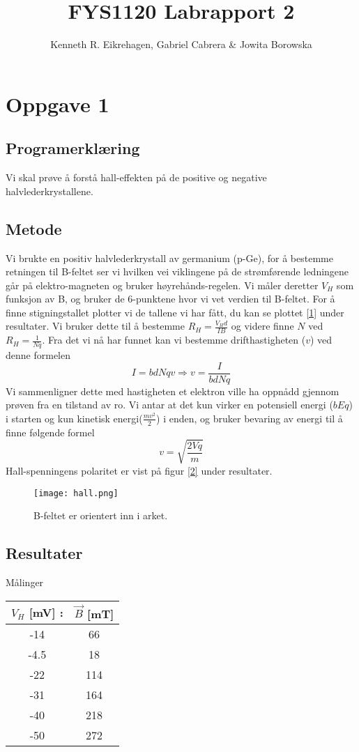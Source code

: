 \documentclass{article}
\begin{document}
\title{FYS1120 Labrapport 2}
\author{Kenneth R. Eikrehagen, Gabriel Cabrera \& Jowita Borowska}

\maketitle
\tableofcontents
\newpage
\section{Oppgave 1}
\subsection{Programerklæring}
Vi skal prøve å forstå hall-effekten på de positive og negative halvlederkrystallene. 

\subsection{Metode}
Vi brukte en positiv halvlederkrystall av germanium (p-Ge), for å bestemme retningen til B-feltet ser vi hvilken vei viklingene på de strømførende ledningene går på elektro-magneten og bruker høyrehånds-regelen. Vi måler deretter $V_H$ som funksjon av B, og bruker de 6-punktene hvor vi vet verdien til B-feltet. For å finne stigningstallet plotter vi de tallene vi har fått, du kan se plottet \ref{1} under resultater. Vi bruker dette til å bestemme $R_H = \frac{V_H d}{IB}$ og videre finne $N$ ved $R_H = \frac{1}{Nq}$. Fra det vi nå har funnet kan vi bestemme drifthastigheten ($v$) ved denne formelen $$I = bdNqv \Rightarrow v = \frac{I}{bdNq}$$ Vi sammenligner dette med hastigheten et elektron ville ha oppnådd gjennom prøven fra en tilstand av ro. Vi antar at det kun virker en potensiell energi ($bEq$) i starten og kun kinetisk energi($\frac{mv^2}{2}$) i enden, og bruker bevaring av energi til å finne følgende formel $$v = \sqrt{\frac{2Vq}{m}}$$ Hall-spenningens polaritet er vist på figur \ref{2} under resultater.

\begin{figure}[h!]
\texttt{[image: hall.png]} 
\caption{B-feltet er orientert inn i arket.}
\label{0}
\end{figure}

\newpage
\subsection{Resultater}

\begin{center}
Målinger\\
  \begin{tabular}{ | c | c |}
    \hline
    $V_H$ [mV] : & $\vec{B}$ [mT]\\ \hline
      -14 & 66 \\ \hline
      -4.5 & 18 \\ \hline
      -22 & 114 \\ \hline
      -31 & 164 \\ \hline
      -40 & 218 \\ \hline
      -50 & 272 \\
    \hline
  \end{tabular}
\end{center}
\end{document}
